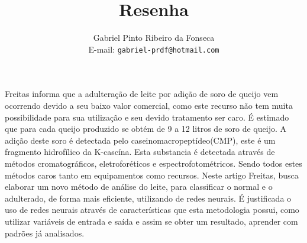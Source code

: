 \documentclass[a4paper,11pt]{article}
\title{Resenha}
\author{Gabriel Pinto Ribeiro da Fonseca\\E-mail: {\tt gabriel-prdf@hotmail.com}}
\date{}
\begin{document}
\maketitle


\begin{multicols}{2}


Freitas\cite{ref:freitas2014} informa que a adulteração de leite por adição de soro de queijo vem ocorrendo devido a seu baixo valor comercial, como este recurso não tem muita possibilidade para sua utilização e seu devido tratamento ser caro. É estimado que para cada queijo produzido se obtém de 9 a 12 litros de soro de queijo.
A adição deste soro é detectada pelo caseinomacropeptídeo(CMP), este é um fragmento hidrofílico da K-cascína.  Esta substancia é detectada através de métodos cromatográficos, eletroforéticos e espectrofotométricos. Sendo todos estes métodos caros tanto em equipamentos como recursos.
Neste artigo Freitas, busca elaborar um novo método de análise do leite, para classificar o normal e o adulterado, de forma mais eficiente, utilizando de redes neurais.
É justificada o uso de redes neurais através de características que esta metodologia possui, como utilizar variáveis de entrada e saída e assim se obter um resultado, aprender com padrões já analisados.


\end{multicols}
\end{document}
